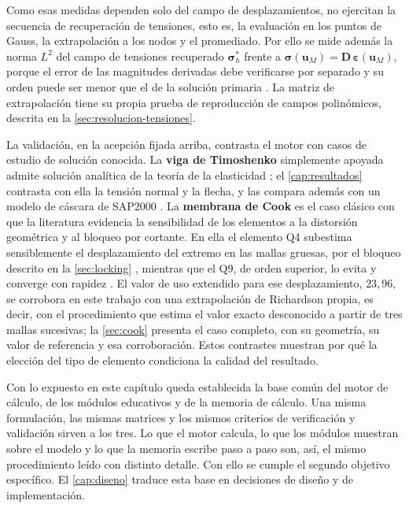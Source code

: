 Como esas medidas dependen solo del campo de desplazamientos, no ejercitan la secuencia de recuperación de tensiones, esto es, la evaluación en los puntos de Gauss, la extrapolación a los nodos y el promediado. Por ello se mide además la norma $L^2$ del campo de tensiones recuperado $\bm{\sigma}^*_h$ frente a $\bm{\sigma}(\bm{u}_M)=\bm{D}\,\bm{\varepsilon}(\bm{u}_M)$, porque el error de las magnitudes derivadas debe verificarse por separado y su orden puede ser menor que el de la solución primaria \autocite[p.~29]{salari2000mms}. La matriz de extrapolación tiene su propia prueba de reproducción de campos polinómicos, descrita en la \autoref{sec:resolucion-tensiones}.

La validación, en la acepción fijada arriba, contrasta el motor con casos de estudio de solución conocida. La \textbf{viga de Timoshenko} simplemente apoyada admite solución analítica de la teoría de la elasticidad \autocite[art.~21, pp.~39-43]{timoshenko1970elasticity}; el \autoref{cap:resultados} contrasta con ella la tensión normal y la flecha, y las compara además con un modelo de cáscara de SAP2000 \autocite[p.~179]{csi2017sap2000}. La \textbf{membrana de Cook} es el caso clásico con que la literatura evidencia la sensibilidad de los elementos a la distorsión geométrica y al bloqueo por cortante. En ella el elemento Q4 subestima sensiblemente el desplazamiento del extremo en las mallas gruesas, por el bloqueo descrito en la \autoref{sec:locking} \autocite[pp.~98-99]{cook2002concepts}, mientras que el Q9, de orden superior, lo evita y converge con rapidez \autocite[p.~243]{hughes2000fem}. El valor de uso extendido para ese desplazamiento, $23{,}96$, se corrobora en este trabajo con una extrapolación de Richardson propia, es decir, con el procedimiento que estima el valor exacto desconocido a partir de tres mallas sucesivas; la \autoref{sec:cook} presenta el caso completo, con su geometría, su valor de referencia y esa corroboración. Estos contrastes muestran por qué la elección del tipo de elemento condiciona la calidad del resultado.

Con lo expuesto en este capítulo queda establecida la base común del motor de cálculo, de los módulos educativos y de la memoria de cálculo. Una misma formulación, las mismas matrices y los mismos criterios de verificación y validación sirven a los tres. Lo que el motor calcula, lo que los módulos muestran sobre el modelo y lo que la memoria escribe paso a paso son, así, el mismo procedimiento leído con distinto detalle. Con ello se cumple el segundo objetivo específico. El \autoref{cap:diseno} traduce esta base en decisiones de diseño y de implementación.
